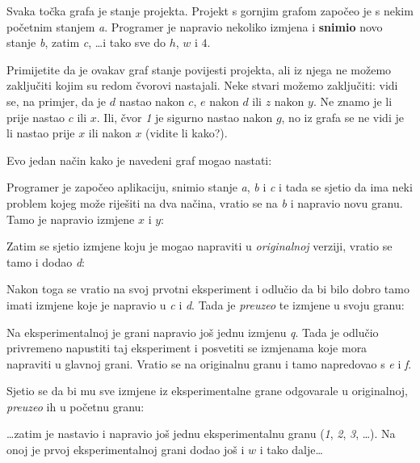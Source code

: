 

Svaka točka grafa je stanje projekta. 
Projekt s gornjim grafom započeo je s nekim početnim stanjem \emph a.
Programer je napravio nekoliko izmjena i \textbf{snimio} novo stanje \emph b, zatim \emph c, \dots i tako sve do $h$, $w$ i $4$.

Primijetite da je ovakav graf stanje povijesti projekta, ali iz njega ne možemo zaključiti kojim su redom čvorovi nastajali.
Neke stvari možemo zaključiti: vidi se, na primjer, da je $d$ nastao nakon $c$, $e$ nakon $d$ ili $z$ nakon $y$.
Ne znamo je li prije nastao $c$ ili $x$.
Ili, čvor \emph 1 je sigurno nastao nakon $g$, no iz grafa se ne vidi je li nastao prije $x$ ili nakon $x$ (vidite li kako?).

Evo jedan način kako je navedeni graf mogao nastati:



Programer je započeo aplikaciju, snimio stanje \emph a, \emph b i \emph c i tada se sjetio da ima neki problem kojeg može riješiti na dva načina, vratio se na \emph b i napravio novu granu. Tamo je napravio izmjene $x$ i $y$:



Zatim se sjetio izmjene koju je mogao napraviti u \emph{originalnoj} verziji, vratio se tamo i dodao \emph d:



Nakon toga se vratio na svoj prvotni eksperiment i odlučio da bi bilo dobro tamo imati izmjene koje je napravio u \emph c i \emph d.
Tada je \emph{preuzeo} te izmjene u svoju granu:



Na eksperimentalnoj je grani napravio još jednu izmjenu \emph q.
Tada je odlučio privremeno napustiti taj eksperiment i posvetiti se izmjenama koje mora napraviti u glavnoj grani.
Vratio se na originalnu granu i tamo napredovao s \emph e i \emph f. 



Sjetio se da bi mu sve izmjene iz eksperimentalne grane odgovarale u originalnoj, \emph{preuzeo} ih u početnu granu:



\dots{}zatim je nastavio i napravio još jednu eksperimentalnu granu (\emph 1, \emph 2, \emph 3, \dots).
Na onoj je prvoj eksperimentalnoj grani dodao još i $w$ i tako dalje\dots

